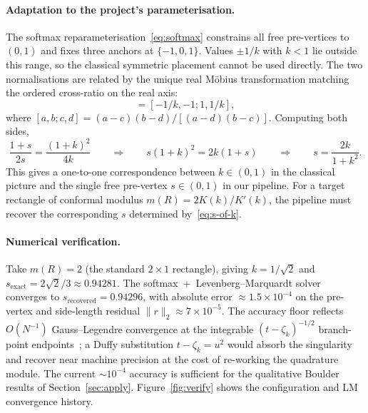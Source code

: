 \documentclass[11pt]{article}
\begin{document}
\paragraph{Adaptation to the project's parameterisation.}
The softmax reparameterisation~\eqref{eq:softmax} constrains all free
pre-vertices to $(0, 1)$ and fixes three anchors at $\{-1, 0, 1\}$. Values
$\pm 1/k$ with $k < 1$ lie outside this range, so the classical symmetric
placement cannot be used directly. The two normalisations are related by the
unique real M\"obius transformation matching the ordered cross-ratio on the
real axis:
\begin{equation}
  [-1, 0; s, 1] = [-1/k, -1; 1, 1/k],
\end{equation}
where $[a, b; c, d] = (a - c)(b - d) / [(a - d)(b - c)]$. Computing both
sides,
\begin{equation}
  \frac{1 + s}{2s} = \frac{(1 + k)^2}{4k}
  \qquad\Longrightarrow\qquad
  s(1 + k)^2 = 2k(1 + s)
  \qquad\Longrightarrow\qquad
  s = \frac{2k}{1 + k^2}.
  \label{eq:s-of-k}
\end{equation}
This gives a one-to-one correspondence between $k \in (0, 1)$ in the classical
picture and the single free pre-vertex $s \in (0, 1)$ in our pipeline. For a
target rectangle of conformal modulus $m(R) = 2K(k) / K'(k)$, the pipeline
must recover the corresponding $s$ determined by~\eqref{eq:s-of-k}.

\paragraph{Numerical verification.}
Take $m(R) = 2$ (the standard $2 \times 1$ rectangle), giving
$k = 1/\sqrt{2}$ and $s_{\text{exact}} = 2\sqrt{2}/3 \approx 0.94281$. The
softmax~+~Levenberg--Marquardt solver converges to
$s_{\text{recovered}} = 0.94296$, with absolute error
$\approx 1.5 \times 10^{-4}$ on the pre-vertex and side-length residual
$\|r\|_2 \approx 7 \times 10^{-5}$. The accuracy floor reflects $O(N^{-1})$
Gauss--Legendre convergence at the integrable $(t - \zeta_k)^{-1/2}$
branch-point endpoints~\citep{DB08}; a Duffy substitution
$t - \zeta_k = u^2$ would absorb the singularity and recover near machine
precision at the cost of re-working the quadrature module. The current
$\sim 10^{-4}$ accuracy is sufficient for the qualitative Boulder results of
Section~\ref{sec:apply}. Figure~\ref{fig:verify} shows the configuration and
LM convergence history.
\end{document}
